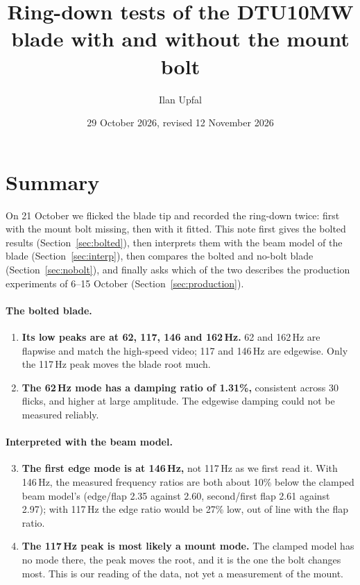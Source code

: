 \documentclass[11pt]{article}
\title{Ring-down tests of the DTU10MW blade with and without the mount bolt}
\author{Ilan Upfal}
\date{29 October 2026, revised 12 November 2026}
\begin{document}
\maketitle

\section*{Summary}

On 21 October we flicked the blade tip and recorded the ring-down twice: first
with the mount bolt missing, then with it fitted. This note first gives the
bolted results (Section~\ref{sec:bolted}), then interprets them with the beam
model of the blade (Section~\ref{sec:interp}), then compares the bolted and
no-bolt blade (Section~\ref{sec:nobolt}), and finally asks which of the two
describes the production experiments of 6--15 October
(Section~\ref{sec:production}).

\paragraph{The bolted blade.}
\begin{enumerate}
  \item \textbf{Its low peaks are at 62, 117, 146 and 162\,Hz.} 62 and
        162\,Hz are flapwise and match the high-speed video; 117 and 146\,Hz
        are edgewise. Only the 117\,Hz peak moves the blade root much.
  \item \textbf{The 62\,Hz mode has a damping ratio of 1.31\%,} consistent
        across 30 flicks, and higher at large amplitude. The edgewise damping
        could not be measured reliably.
\end{enumerate}

\paragraph{Interpreted with the beam model.}
\begin{enumerate}
  \setcounter{enumi}{2}
  \item \textbf{The first edge mode is at 146\,Hz,} not 117\,Hz as we first
        read it. With 146\,Hz, the measured frequency ratios are both about
        10\% below the clamped beam model's (edge/flap 2.35 against 2.60,
        second/first flap 2.61 against 2.97); with 117\,Hz the edge ratio would
        be 27\% low, out of line with the flap ratio.
  \item \textbf{The 117\,Hz peak is most likely a mount mode.} The clamped
        model has no mode there, the peak moves the root, and it is the one
        the bolt changes most. This is our reading of the data, not yet a
        measurement of the mount.
\end{enumerate}
\end{document}
